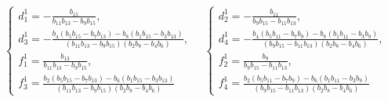 \begin{equation*}
    \begin{cases}
        d_1^1 = -\frac{b_{15}}{b_{11} b_{13} - b_9 b_{15}}, \\
        d_3^1 = -\frac{b_4(b_5 b_{15} - b_{7} b_{13}) - b_8(b_1 b_{15} - b_3 b_{13})}{(b_{11} b_{13} - b_9 b_{15})(b_2 b_8 - b_4 b_6)}, \\
        f_1^1 = \frac{b_{13}}{b_{11} b_{13} - b_9 b_{15}}, \\
        f_3^1 = \frac{b_2(b_5 b_{15} - b_{7} b_{13}) - b_6(b_1 b_{15} - b_3 b_{13})}{(b_{11} b_{13} - b_9 b_{15})(b_2 b_8 - b_4 b_6)}
    \end{cases} \quad
    \begin{cases}
        d_2^1 = -\frac{b_{11}}{b_9 b_{15} - b_{11} b_{13}}, \\
        d_4^1 = -\frac{b_4(b_5 b_{11} - b_{7} b_{9}) - b_8(b_1 b_{11} - b_3 b_{9})}{(b_9 b_{15} - b_{11} b_{13})(b_2 b_8 - b_4 b_6)}, \\
        f_2^1 = \frac{b_9}{b_9 b_{15} - b_{11} b_{13}}, \\
        f_4^1 = \frac{b_2(b_5 b_{11} - b_{7} b_{9}) - b_6(b_1 b_{11} - b_3 b_{9})}{(b_9 b_{15} - b_{11} b_{13})(b_2 b_8 - b_4 b_6)}
    \end{cases}
\end{equation*}

